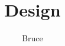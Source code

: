 \documentclass[]{article}
\title{Design}
\author{Bruce}
\date{}
\begin{document}
\maketitle

\section{}
\end{document}
